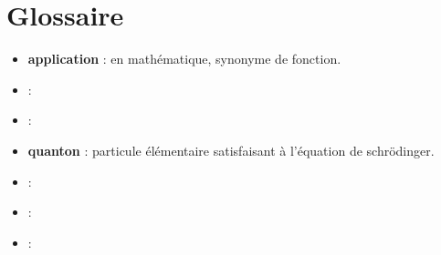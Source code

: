 
\chapter{Glossaire}

\begin{itemize}[leftmargin=1cm, label=, itemsep=2pt]
\item {\bf application} : en mathématique, synonyme de fonction.
\item {\bf } :
\item {\bf } :
\item {\bf quanton} : particule élémentaire satisfaisant à l'équation de schrödinger.
\item {\bf } :
\item {\bf } :
\item {\bf } :
\end{itemize}



